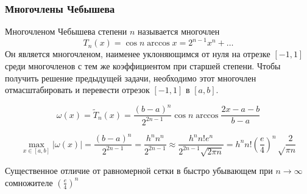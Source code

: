 \documentclass[aspectratio=169,unicode]{beamer}
\begin{document}
\begin{frame}
\frametitle{Многочлены Чебышева}
	Многочленом Чебышева степени $n$ называется многочлен
	\[
	T_n(x) = \cos n \arccos x = 2^{n-1} x^n + \dots
	\]
	Он является многочленом, наименее уклоняющимся от нуля на отрезке $[-1,1]$ среди
	многочленов с тем же коэффициентом при старшей степени.
	Чтобы получить решение предыдущей задачи, необходимо этот многочлен отмасштабировать
	и перевести отрезок $[-1,1]$ в $[a,b]$.
	\pause

	\[
	\omega(x) = \widetilde{T}_n(x) = \frac{(b-a)^n}{2^{2n-1}} \cos n \arccos \frac{2x-a-b}{b-a}
	\]

	\pause
	$$
	\max_{x\in[a,b]} |\omega(x)| = \frac{(b-a)^n}{2^{2n-1}} =
	\frac{h^n n^n}{2^{2n-1}} \approx \frac{h^n n! e^n}{2^{2n-1}\sqrt{2\pi n}} =
	h^n n! \left(\frac{e}{4}\right)^n \sqrt\frac{2}{\pi n}
	$$

	Существенное отличие от равномерной сетки в быстро убывающем при $n
	\rightarrow \infty$ сомножителе $\left(\frac{e}{4}\right)^n$
\end{frame}
\end{document}
